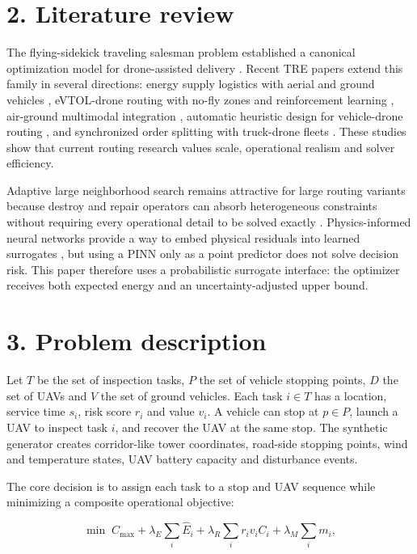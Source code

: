 \documentclass[preprint,12pt]{elsarticle}
\begin{document}
\section{2. Literature review}

The flying-sidekick traveling salesman problem established a canonical optimization model for drone-assisted delivery \cite{murray2015flying}. Recent TRE papers extend this family in several directions: energy supply logistics with aerial and ground vehicles \cite{kim2026bidirectional}, eVTOL-drone routing with no-fly zones and reinforcement learning \cite{liu2026evtol}, air-ground multimodal integration \cite{zhang2026airground}, automatic heuristic design for vehicle-drone routing \cite{shi2026llm}, and synchronized order splitting with truck-drone fleets \cite{yang2025integrated}. These studies show that current routing research values scale, operational realism and solver efficiency.

Adaptive large neighborhood search remains attractive for large routing variants because destroy and repair operators can absorb heterogeneous constraints without requiring every operational detail to be solved exactly \cite{ropke2006alns}. Physics-informed neural networks provide a way to embed physical residuals into learned surrogates \cite{raissi2019pinn}, but using a PINN only as a point predictor does not solve decision risk. This paper therefore uses a probabilistic surrogate interface: the optimizer receives both expected energy and an uncertainty-adjusted upper bound.

\section{3. Problem description}

Let \(T\) be the set of inspection tasks, \(P\) the set of vehicle stopping points, \(D\) the set of UAVs and \(V\) the set of ground vehicles. Each task \(i \in T\) has a location, service time \(s_i\), risk score \(r_i\) and value \(v_i\). A vehicle can stop at \(p \in P\), launch a UAV to inspect task \(i\), and recover the UAV at the same stop. The synthetic generator creates corridor-like tower coordinates, road-side stopping points, wind and temperature states, UAV battery capacity and disturbance events.

The core decision is to assign each task to a stop and UAV sequence while minimizing a composite operational objective:

\[
\min \; C_{\max} + \lambda_E \sum_i \hat E_i + \lambda_R \sum_i r_i v_i C_i + \lambda_M \sum_i m_i,
\]
\end{document}
